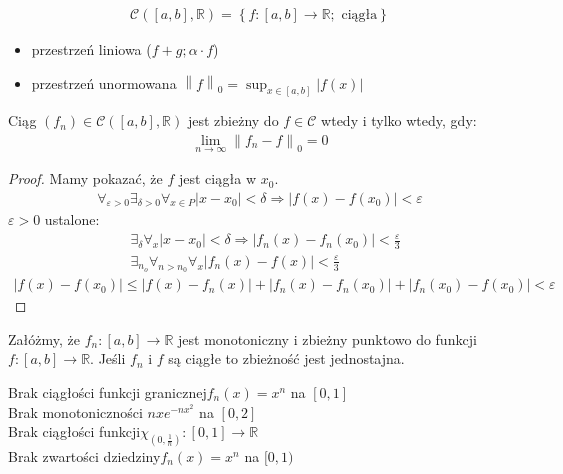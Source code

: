 \begin{gather*}
\mathcal C \left(\left[a,b\right],\mathbb R \right)=
\left\{f:\left[a,b\right]\to \mathbb R ;\text{ ciągła}\right\}
\end{gather*}
\begin{itemize}
\item przestrzeń liniowa ($ f+g;\alpha\cdot f $)
\item przestrzeń unormowana $ \left\|f\right\|_0=\sup_{x\in\left[a,b\right]}\left|f(x)\right| $
\end{itemize}
\begin{twr}
Ciąg $ \left(f_n\right)\in \mathcal C \left(\left[a,b\right],\mathbb R \right) $ jest zbieżny do $ f\in \mathcal C  $ wtedy i tylko wtedy, gdy:
\begin{gather*}
\lim\limits_{n\to\infty }\left\|f_n-f\right\|_0=0
\end{gather*}
\end{twr}
\begin{proof}
Mamy pokazać, że $ f $ jest ciągła w $ x_0 $.
\begin{gather*}
\forall_{\varepsilon>0}
\exists_{\delta>0}
\forall_{x\in P}
\left|x-x_0\right|<\delta
\Rightarrow
\left|f(x)-f(x_0)\right|<\varepsilon
\end{gather*}
$ \varepsilon>0 $ ustalone:
\begin{align*}
&\exists_\delta
\forall_x
\left|x-x_0\right|<\delta\Rightarrow \left|f_n(x)-f_n(x_0)\right|<\tfrac{\varepsilon}{3}\\
&\exists_{n_o}
\forall_{n>n_0}
\forall_x
\left|f_n(x)-f(x)\right|<\tfrac{\varepsilon}{3}
\end{align*}
\begin{gather*}
\left|f(x)-f(x_0)\right|
\le
\left|f(x)-f_n(x)\right|
+
\left|f_n(x)-f_n(x_0)\right|
+
\left|f_n(x_0)-f(x_0)\right|<\varepsilon
\end{gather*}
\end{proof}
\begin{twr}
Załóżmy, że $ f_n:\left[a,b\right] \to \mathbb R $ jest monotoniczny i zbieżny punktowo do funkcji $ f:\left[a,b\right] \to \mathbb R $. Jeśli $ f_n $ i $ f $ są ciągłe to zbieżność jest jednostajna.
\end{twr}
\begin{prz}
Brak ciągłości funkcji granicznej\qquad$ f_n(x)=x^n $ na $ \left[0,1\right] $\\
Brak monotoniczności\qquad
$ nxe^{-nx^2} $ na $ \left[0,2\right] $\\
Brak ciągłości funkcji\qquad$ \chi_{\left(0,\frac{1}{n}\right)} :[0,1]\to \mathbb R $\\
Brak zwartości dziedziny\qquad $ f_n(x)=x^n $ na $ [0,1) $
\end{prz}